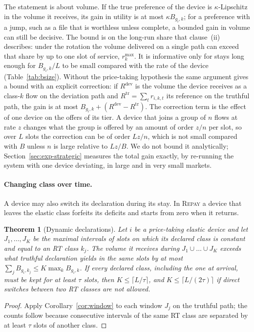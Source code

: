 \documentclass[preprint,11pt]{elsarticle}
\newtheorem{theorem}{Theorem}
\theoremstyle{definition}
\theoremstyle{remark}
\newcommand{\rmax}{r^{\max}}
\newcommand{\repay}{\textsc{Repay}}
\begin{document}
The statement is about volume. If the true preference of the device is $\kappa$-Lipschitz in the volume it receives, its gain in utility is at most $\kappa B_{g_i,k}$; for a preference with a jump, such as a file that is worthless unless complete, a bounded gain in volume can still be decisive.
The bound is on the long-run share that clause~(ii) describes: under the rotation the volume delivered on a single path can exceed that share by up to one slot of service, $\rmax_k$.
It is informative only for stays long enough for $B_{g_i,k}/L$ to be small compared with the rate of the device (Table~\ref{tab:bsize}).
Without the price-taking hypothesis the same argument gives a bound with an explicit correction: if $R^{\mathrm{dev}}$ is the volume the device receives as a class-$k$ flow on the deviation path and $R^{\mathrm{tr}}=\sum_tr_{i,k,t}$ its reference on the truthful path, the gain is at most $B_{g_i,k}+(R^{\mathrm{dev}}-R^{\mathrm{tr}})$.
The correction term is the effect of one device on the offers of its tier. A device that joins a group of $n$ flows at rate $z$ changes what the group is offered by an amount of order $z/n$ per slot, so over $L$ slots the correction can be of order $Lz/n$, which is not small compared with $B$ unless $n$ is large relative to $Lz/B$. We do not bound it analytically; Section~\ref{sec:exp-strategic} measures the total gain exactly, by re-running the system with one device deviating, in large and in very small markets.

\paragraph{Changing class over time.}
A device may also switch its declaration during its stay.
In \repay{} a device that leaves the elastic class forfeits its deficits and starts from zero when it returns.

\begin{theorem}[Dynamic declarations]\label{thm:dynamic}
Let $i$ be a price-taking elastic device and let $J_1,\dots,J_K$ be the maximal intervals of slots on which its declared class is constant and equal to an RT class $k_j$.
The volume it receives during $J_1\cup\dots\cup J_K$ exceeds what truthful declaration yields in the same slots by at most $\sum_{j}B_{g_i,k_j}\le K\max_kB_{g_i,k}$.
If every declared class, including the one at arrival, must be kept for at least $\tau$ slots, then $K\le\lceil L/\tau\rceil$, and $K\le\lceil L/(2\tau)\rceil$ if direct switches between two RT classes are not allowed.
\end{theorem}
\begin{proof}
Apply Corollary~\ref{cor:window} to each window $J_j$ on the truthful path; the counts follow because consecutive intervals of the same RT class are separated by at least $\tau$ slots of another class.
\end{proof}
\end{document}
